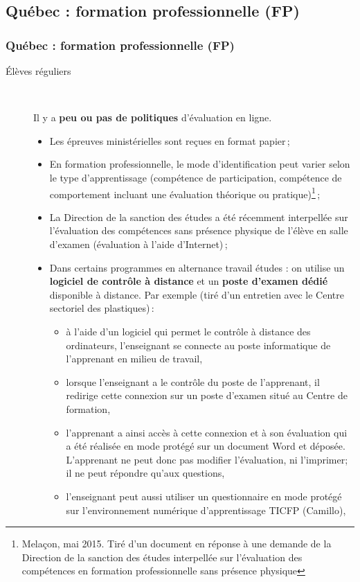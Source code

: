 \documentclass{beamer}
\begin{document}
	\subsection{Québec : formation professionnelle (FP)} 
			\begin{frame}[allowframebreaks]
				  \frametitle{Québec : formation professionnelle (FP)}
				 \begin{description}
					\item[Élèves réguliers] \ \ \par Il y a \textbf{peu ou pas de politiques} d'évaluation en ligne.
						\begin{itemize}
							\item Les épreuves ministérielles sont reçues en format papier\,;
							\item En formation professionnelle, le mode d’identification peut varier selon le type d’apprentissage (compétence de participation, compétence de comportement incluant une évaluation théorique ou pratique)\footnote{Melaçon, mai 2015. Tiré d'un document en réponse à une demande de la Direction de la sanction des études interpellée sur l'évaluation des compétences en formation professionnelle sans présence physique}\,; 
							\item La Direction de la sanction des études a été récemment interpellée sur l’évaluation des compétences sans présence physique de l’élève en salle d’examen (évaluation à l’aide d’Internet)\,;
							\item Dans certains programmes en alternance travail études : on utilise un \textbf{logiciel de contrôle à distance} et un \textbf{poste d’examen dédié} disponible à distance. Par exemple (tiré d'un entretien avec le Centre sectoriel des plastiques)\,: 
							\begin{itemize}
								\item à l'aide d'un logiciel qui permet le contrôle à distance des ordinateurs, l'enseignant se connecte au poste informatique de l'apprenant en milieu de travail,
								\item lorsque l'enseignant a le contrôle du poste de l'apprenant, il redirige cette connexion sur un poste d'examen situé au Centre de formation,
								\item l'apprenant a ainsi accès à cette connexion et à son évaluation qui a été réalisée en mode protégé sur un document Word et déposée. L'apprenant ne peut donc pas modifier l'évaluation, ni l'imprimer; il ne peut répondre qu'aux questions,
								\item l'enseignant peut aussi utiliser un questionnaire en mode protégé sur l'environnement numérique d'apprentissage TICFP (Camillo),

\end{itemize}
\end{itemize}
\end{description}
\end{frame}
\end{document}
